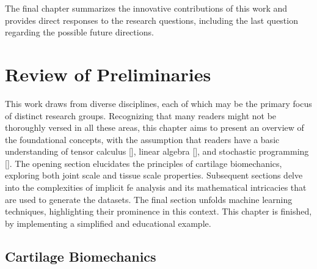 \documentclass[12pt,a4paper]{report}
\begin{document}
The final chapter summarizes the innovative contributions of this work and provides direct responses to the research questions, including the last question regarding the possible future directions.

\chapter{Review of Preliminaries}\label{ch2}
This work draws from diverse disciplines, each of which may be the primary focus of distinct research groups. Recognizing that many readers might not be thoroughly versed in all these areas, this chapter aims to present an overview of the foundational concepts, with the assumption that readers have a basic understanding of tensor calculus [\cite{fleisch2011}], linear algebra [\cite{strang2023}], and stochastic programming [\cite{birge2011}]. The opening section elucidates the principles of cartilage biomechanics, exploring both joint scale and tissue scale properties. Subsequent sections delve into the complexities of implicit \ac{fe} analysis and its mathematical intricacies that are used to generate the datasets. The final section unfolds machine learning techniques, highlighting their prominence in this context. This chapter is finished, by implementing a simplified and educational example.

\section{Cartilage Biomechanics}
\end{document}
